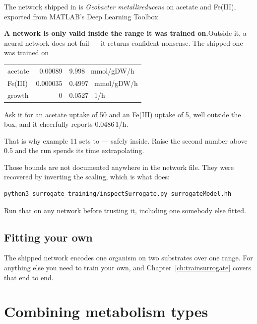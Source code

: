 The network shipped in  is \emph{Geobacter
metallireducens} on acetate and Fe(III), exported from MATLAB's Deep Learning
Toolbox.

\begin{cbwarn}
\textbf{\color{cbRed}A network is only valid inside the range it was trained
on.}\quad Outside it, a neural network does not fail --- it returns confident
nonsense. The shipped one was trained on

\begin{center}
\begin{tabular}{@{}lr@{ \ to \ }l@{}}
acetate  & 0.00089 & 9.998 \ mmol/gDW/h\\
Fe(III)  & 0.000035 & 0.4997 \ mmol/gDW/h\\
growth   & 0 & 0.0527 \ 1/h\\
\end{tabular}
\end{center}

Ask it for an acetate uptake of 50 and an Fe(III) uptake of 5, well outside the
box, and it cheerfully reports 0.0486\,1/h.

That is why example 11 sets  to  ---
safely inside. Raise the second number above 0.5 and the run spends its time
extrapolating.
\end{cbwarn}

Those bounds are not documented anywhere in the network file. They were
recovered by inverting the  scaling, which is what
 does:

\begin{lstlisting}[style=sh]
python3 surrogate_training/inspectSurrogate.py surrogateModel.hh
\end{lstlisting}

Run that on any network before trusting it, including one somebody else fitted.

\section{Fitting your own}

The shipped network encodes one organism on two substrates over one range. For
anything else you need to train your own, and Chapter~\ref{ch:trainsurrogate}
covers that end to end.

\chapter{Combining metabolism types}
\label{ch:combined}

